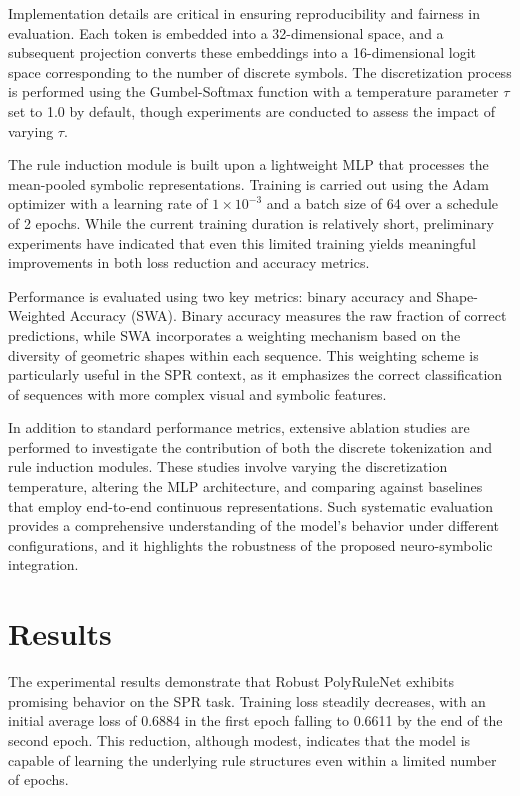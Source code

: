 \documentclass[11pt]{article}
\begin{document}
Implementation details are critical in ensuring reproducibility and fairness in evaluation. Each token is embedded into a 32-dimensional space, and a subsequent projection converts these embeddings into a 16-dimensional logit space corresponding to the number of discrete symbols. The discretization process is performed using the Gumbel-Softmax function with a temperature parameter \(\tau\) set to 1.0 by default, though experiments are conducted to assess the impact of varying \(\tau\).

The rule induction module is built upon a lightweight MLP that processes the mean-pooled symbolic representations. Training is carried out using the Adam optimizer with a learning rate of \(1 \times 10^{-3}\) and a batch size of 64 over a schedule of 2 epochs. While the current training duration is relatively short, preliminary experiments have indicated that even this limited training yields meaningful improvements in both loss reduction and accuracy metrics.

Performance is evaluated using two key metrics: binary accuracy and Shape-Weighted Accuracy (SWA). Binary accuracy measures the raw fraction of correct predictions, while SWA incorporates a weighting mechanism based on the diversity of geometric shapes within each sequence. This weighting scheme is particularly useful in the SPR context, as it emphasizes the correct classification of sequences with more complex visual and symbolic features.

In addition to standard performance metrics, extensive ablation studies are performed to investigate the contribution of both the discrete tokenization and rule induction modules. These studies involve varying the discretization temperature, altering the MLP architecture, and comparing against baselines that employ end-to-end continuous representations. Such systematic evaluation provides a comprehensive understanding of the model's behavior under different configurations, and it highlights the robustness of the proposed neuro-symbolic integration.

\section{Results}
The experimental results demonstrate that Robust PolyRuleNet exhibits promising behavior on the SPR task. Training loss steadily decreases, with an initial average loss of 0.6884 in the first epoch falling to 0.6611 by the end of the second epoch. This reduction, although modest, indicates that the model is capable of learning the underlying rule structures even within a limited number of epochs.
\end{document}
